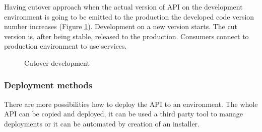 Having cutover approach when the actual version of API on the development environment is going to be emitted to the production the developed code version number increases (Figure \ref{fig:cutover-development}). Development on a new version starts. The cut version is, after being stable, released to the production. Consumers connect to production environment to use services. 

\begin{figure}[htp] 
\caption{Cutover development}
\label{fig:cutover-development}
\end{figure}  


\subsubsection{Deployment methods}
There are more possibilities how to deploy the API to an environment. The whole API can be copied and deployed, it can be used a third party tool to manage deployments or it can be automated by creation of an installer.

